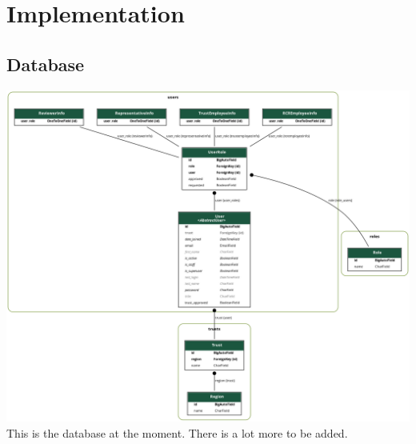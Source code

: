 \section{Implementation}
\subsection{Database}
\includegraphics[width=\linewidth]{images/database.png}
This is the database at the moment. There is a lot more to be added.

